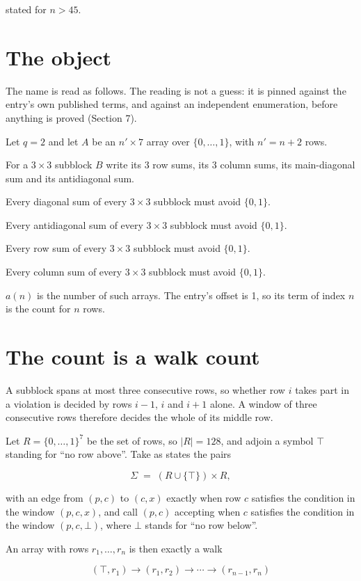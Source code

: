 \documentclass[11pt]{article}
\theoremstyle{definition}
\begin{document}
stated for $n > 45$.

\section{The object}

The name is read as follows. The reading is not a guess: it is pinned against the entry's own published terms, and against an independent enumeration, before anything is proved (Section 7).

Let $q = 2$ and let $A$ be an $n' \times 7$ array over $\{0,\dots,1\}$, with $n' = n + 2$ rows.

For a $3\times3$ subblock $B$ write its 3 row sums, its 3 column sums, its main-diagonal sum and its antidiagonal sum.

Every diagonal sum of every $3\times3$ subblock must avoid $\{0, 1\}$.

Every antidiagonal sum of every $3\times3$ subblock must avoid $\{0, 1\}$.

Every row sum of every $3\times3$ subblock must avoid $\{0, 1\}$.

Every column sum of every $3\times3$ subblock must avoid $\{0, 1\}$.

$a(n)$ is the number of such arrays. The entry's offset is 1, so its term of index $n$ is the count for $n$ rows.

\section{The count is a walk count}

A subblock spans at most three consecutive rows, so whether row $i$ takes part in a violation is decided by rows $i-1$, $i$ and $i+1$ alone. A window of three consecutive rows therefore decides the whole of its middle row.

Let $R = \{0,\dots,1\}^{7}$ be the set of rows, so $|R| = 128$, and adjoin a symbol $\top$ standing for ``no row above''. Take as states the pairs

\[\Sigma \;=\; (R \cup \{\top\}) \times R,\]

with an edge from $(p,c)$ to $(c,x)$ exactly when row $c$ satisfies the condition in the window $(p,c,x)$, and call $(p,c)$ accepting when $c$ satisfies the condition in the window $(p,c,\bot)$, where $\bot$ stands for ``no row below''.

An array with rows $r_1,\dots,r_n$ is then exactly a walk

\[(\top,r_1) \to (r_1,r_2) \to \cdots \to (r_{n-1},r_n)\]
\end{document}
